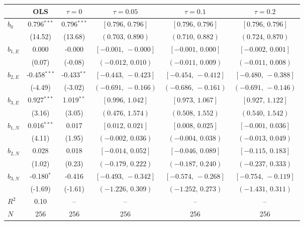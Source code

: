 \begingroup
\footnotesize\setlength{\tabcolsep}{3pt}
\begin{tabular}{lccccc}
\toprule
 & OLS & $\tau{=}0$ & $\tau{=}0.05$ & $\tau{=}0.1$ & $\tau{=}0.2$ \\
\midrule
$b_0$ & 0.796$^{***}$ & 0.796$^{***}$ & $[0.796,\,0.796]$ & $[0.796,\,0.796]$ & $[0.796,\,0.796]$ \\
 & (14.52) & (13.68) & $(0.703,\,0.890)$ & $(0.710,\,0.882)$ & $(0.724,\,0.870)$ \\
$b_{1,E}$ & 0.000 & -0.000 & $[-0.001,\,-0.000]$ & $[-0.001,\,0.000]$ & $[-0.002,\,0.001]$ \\
 & (0.07) & (-0.08) & $(-0.012,\,0.010)$ & $(-0.011,\,0.009)$ & $(-0.011,\,0.008)$ \\
$b_{2,E}$ & -0.458$^{***}$ & -0.433$^{**}$ & $[-0.443,\,-0.423]$ & $[-0.454,\,-0.412]$ & $[-0.480,\,-0.388]$ \\
 & (-4.49) & (-3.02) & $(-0.691,\,-0.166)$ & $(-0.686,\,-0.161)$ & $(-0.691,\,-0.146)$ \\
$b_{3,E}$ & 0.927$^{***}$ & 1.019$^{**}$ & $[0.996,\,1.042]$ & $[0.973,\,1.067]$ & $[0.927,\,1.122]$ \\
 & (3.16) & (3.05) & $(0.476,\,1.574)$ & $(0.508,\,1.552)$ & $(0.540,\,1.542)$ \\
\midrule
$b_{1,N}$ & 0.016$^{***}$ & 0.017 & $[0.012,\,0.021]$ & $[0.008,\,0.025]$ & $[-0.001,\,0.036]$ \\
 & (4.11) & (1.95) & $(-0.002,\,0.036)$ & $(-0.004,\,0.038)$ & $(-0.013,\,0.049)$ \\
$b_{2,N}$ & 0.028 & 0.018 & $[-0.014,\,0.052]$ & $[-0.046,\,0.089]$ & $[-0.115,\,0.183]$ \\
 & (1.02) & (0.23) & $(-0.179,\,0.222)$ & $(-0.187,\,0.240)$ & $(-0.237,\,0.333)$ \\
$b_{3,N}$ & -0.180$^{*}$ & -0.416 & $[-0.493,\,-0.342]$ & $[-0.574,\,-0.268]$ & $[-0.754,\,-0.119]$ \\
 & (-1.69) & (-1.61) & $(-1.226,\,0.309)$ & $(-1.252,\,0.273)$ & $(-1.431,\,0.311)$ \\
\midrule
$R^2$ & 0.10 & -- & -- & -- & -- \\
$N$ & 256 & 256 & 256 & 256 & 256 \\
\bottomrule
\end{tabular}
\endgroup
